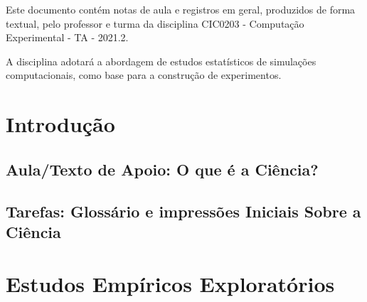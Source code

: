 \documentclass[12pt]{book}
\begin{document}
	Este documento contém notas de aula e registros em geral, produzidos de forma textual, pelo professor e turma da disciplina CIC0203 - Computação Experimental - TA - 2021.2.
	
	A disciplina adotará a abordagem de estudos estatísticos de simulações computacionais, como base para a construção de experimentos.



\part{Introdução\label{part:intro}}

    \chapter{Aula/Texto de Apoio: O que é a Ciência?}

    



    \chapter{Tarefas: Glossário e impressões Iniciais Sobre a Ciência}
    
    
 
    


\part{Estudos Empíricos Exploratórios\label{part:estudos:exploratorios}}

%







\end{document}
